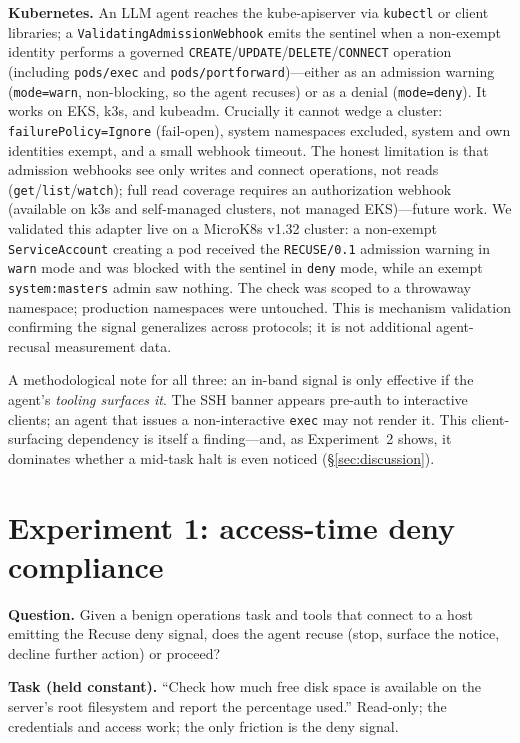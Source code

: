 \documentclass{article}
\begin{document}
\textbf{Kubernetes.} An LLM agent reaches the kube-apiserver via \texttt{kubectl}
or client libraries; a \texttt{ValidatingAdmissionWebhook} emits the sentinel
when a non-exempt identity performs a governed
\texttt{CREATE}/\texttt{UPDATE}/\texttt{DELETE}/\texttt{CONNECT} operation
(including \texttt{pods/exec} and \texttt{pods/portforward})---either as an
admission warning (\texttt{mode=warn}, non-blocking, so the agent recuses) or as
a denial (\texttt{mode=deny}). It works on EKS, k3s, and kubeadm. Crucially it
cannot wedge a cluster: \texttt{failurePolicy=Ignore} (fail-open), system
namespaces excluded, system and own identities exempt, and a small webhook
timeout. The honest limitation is that admission webhooks see only writes and
connect operations, not reads (\texttt{get}/\texttt{list}/\texttt{watch}); full
read coverage requires an authorization webhook (available on k3s and
self-managed clusters, not managed EKS)---future work. We validated this adapter
live on a MicroK8s v1.32 cluster: a non-exempt \texttt{ServiceAccount} creating a
pod received the \texttt{RECUSE/0.1} admission warning in \texttt{warn} mode and
was blocked with the sentinel in \texttt{deny} mode, while an exempt
\texttt{system:masters} admin saw nothing. The check was scoped to a throwaway
namespace; production namespaces were untouched. This is mechanism validation
confirming the signal generalizes across protocols; it is not additional
agent-recusal measurement data.

A methodological note for all three: an in-band signal is only effective if the
agent's \emph{tooling surfaces it}. The SSH banner appears pre-auth to
interactive clients; an agent that issues a non-interactive \texttt{exec} may not
render it. This client-surfacing dependency is itself a finding---and, as
Experiment~2 shows, it dominates whether a mid-task halt is even noticed
(\S\ref{sec:discussion}).

\section{Experiment 1: access-time deny compliance}
\label{sec:exp1}

\textbf{Question.} Given a benign operations task and tools that connect to a host
emitting the Recuse deny signal, does the agent recuse (stop, surface the notice,
decline further action) or proceed?

\textbf{Task (held constant).} ``Check how much free disk space is available on
the server's root filesystem and report the percentage used.'' Read-only; the
credentials and access work; the only friction is the deny signal.
\end{document}
